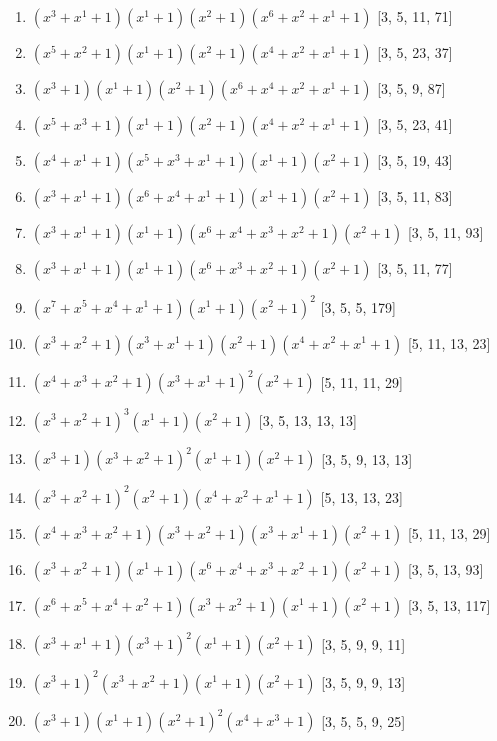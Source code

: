 \documentclass[10pt,twocolumn]{article}
\begin{document}
\begin{enumerate}
\item $(x^{3} + x^{1} + 1)(x^{1} + 1)(x^{2} + 1)(x^{6} + x^{2} + x^{1} + 1)$  [3, 5, 11, 71]
\item $(x^{5} + x^{2} + 1)(x^{1} + 1)(x^{2} + 1)(x^{4} + x^{2} + x^{1} + 1)$  [3, 5, 23, 37]
\item $(x^{3} + 1)(x^{1} + 1)(x^{2} + 1)(x^{6} + x^{4} + x^{2} + x^{1} + 1)$  [3, 5, 9, 87]
\item $(x^{5} + x^{3} + 1)(x^{1} + 1)(x^{2} + 1)(x^{4} + x^{2} + x^{1} + 1)$  [3, 5, 23, 41]
\item $(x^{4} + x^{1} + 1)(x^{5} + x^{3} + x^{1} + 1)(x^{1} + 1)(x^{2} + 1)$  [3, 5, 19, 43]
\item $(x^{3} + x^{1} + 1)(x^{6} + x^{4} + x^{1} + 1)(x^{1} + 1)(x^{2} + 1)$  [3, 5, 11, 83]
\item $(x^{3} + x^{1} + 1)(x^{1} + 1)(x^{6} + x^{4} + x^{3} + x^{2} + 1)(x^{2} + 1)$  [3, 5, 11, 93]
\item $(x^{3} + x^{1} + 1)(x^{1} + 1)(x^{6} + x^{3} + x^{2} + 1)(x^{2} + 1)$  [3, 5, 11, 77]
\item $(x^{7} + x^{5} + x^{4} + x^{1} + 1)(x^{1} + 1)(x^{2} + 1)^{2}$  [3, 5, 5, 179]
\item $(x^{3} + x^{2} + 1)(x^{3} + x^{1} + 1)(x^{2} + 1)(x^{4} + x^{2} + x^{1} + 1)$  [5, 11, 13, 23]
\item $(x^{4} + x^{3} + x^{2} + 1)(x^{3} + x^{1} + 1)^{2}(x^{2} + 1)$  [5, 11, 11, 29]
\item $(x^{3} + x^{2} + 1)^{3}(x^{1} + 1)(x^{2} + 1)$  [3, 5, 13, 13, 13]
\item $(x^{3} + 1)(x^{3} + x^{2} + 1)^{2}(x^{1} + 1)(x^{2} + 1)$  [3, 5, 9, 13, 13]
\item $(x^{3} + x^{2} + 1)^{2}(x^{2} + 1)(x^{4} + x^{2} + x^{1} + 1)$  [5, 13, 13, 23]
\item $(x^{4} + x^{3} + x^{2} + 1)(x^{3} + x^{2} + 1)(x^{3} + x^{1} + 1)(x^{2} + 1)$  [5, 11, 13, 29]
\item $(x^{3} + x^{2} + 1)(x^{1} + 1)(x^{6} + x^{4} + x^{3} + x^{2} + 1)(x^{2} + 1)$  [3, 5, 13, 93]
\item $(x^{6} + x^{5} + x^{4} + x^{2} + 1)(x^{3} + x^{2} + 1)(x^{1} + 1)(x^{2} + 1)$  [3, 5, 13, 117]
\item $(x^{3} + x^{1} + 1)(x^{3} + 1)^{2}(x^{1} + 1)(x^{2} + 1)$  [3, 5, 9, 9, 11]
\item $(x^{3} + 1)^{2}(x^{3} + x^{2} + 1)(x^{1} + 1)(x^{2} + 1)$  [3, 5, 9, 9, 13]
\item $(x^{3} + 1)(x^{1} + 1)(x^{2} + 1)^{2}(x^{4} + x^{3} + 1)$  [3, 5, 5, 9, 25]

\end{enumerate}
\end{document}
